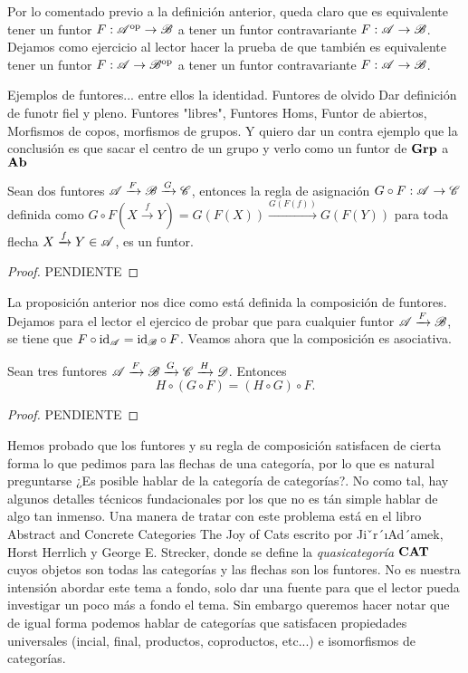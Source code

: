 \documentclass{comunicaciones}
\begin{document}
Por lo comentado previo a la definición anterior, queda claro que es equivalente tener un funtor $F:\mathscr A^{\mathrm{op}}\to\mathscr B$ a tener un funtor contravariante $F:\mathscr A\to\mathscr B$.
Dejamos como ejercicio al lector hacer la prueba de que también es equivalente tener un funtor $F:\mathscr A\to\mathscr B^{\mathrm{op}}$ a tener un funtor contravariante $F:\mathscr A\to\mathscr B$.



Ejemplos de funtores... entre ellos la identidad. Funtores de olvido Dar definición de funotr fiel y pleno. Funtores "libres", Funtores Homs, Funtor de abiertos, Morfismos de copos, morfismos de grupos. 
Y quiero dar un contra ejemplo que la conclusión es que sacar el centro de un grupo y verlo como un funtor de $\mathbf{Grp}$ a $\mathbf{Ab}$

\begin{prop}
    Sean dos funtores $\mathscr A\xrightarrow{F}\mathscr B\xrightarrow{G}\mathscr C$, entonces la regla de asignación $G\circ F:\mathscr A\to\mathscr C$ definida como 
    $G\circ F(X\xrightarrow{f}Y)=G(F(X))\xrightarrow{G(F(f))}G(F(Y))$ para toda flecha $X\xrightarrow{f}Y\in\mathscr A$, es un funtor.
\end{prop}
\begin{proof}
    PENDIENTE
\end{proof}

La proposición anterior nos dice como está definida la composición de funtores. Dejamos para el lector el ejercico de probar que para cualquier funtor $\mathscr A\xrightarrow{F}\mathscr B$, se tiene que $F\circ\mathrm{id}_\mathscr A=\mathrm{id}_\mathscr B\circ F$.
Veamos ahora que la composición es asociativa.

\begin{prop}
    Sean tres funtores $\mathscr A\xrightarrow{F}\mathscr B\xrightarrow{G}\mathscr C\xrightarrow{H}\mathscr D$. Entonces $$H\circ(G\circ F)=(H\circ G)\circ F.$$
\end{prop}
\begin{proof}
    PENDIENTE
\end{proof}

Hemos probado que los funtores y su regla de composición satisfacen de cierta forma lo que pedimos para las flechas de una categoría, por lo que es natural preguntarse
¿Es posible hablar de la categoría de categorías?. No como tal, hay algunos detalles técnicos fundacionales por los que no es tán simple hablar de algo tan inmenso. Una manera de
tratar con este problema está en el libro Abstract and Concrete Categories The Joy of Cats escrito por Jiˇr´ıAd´amek, Horst Herrlich y George E. Strecker, donde se define la 
\emph{quasicategoría} $\mathbf{CAT}$ cuyos objetos son todas las categorías y las flechas son los funtores. No es nuestra intensión abordar este tema a fondo, 
solo dar una fuente para que el lector pueda investigar un poco más a fondo el tema. Sin embargo queremos hacer notar que de igual forma podemos
hablar de categorías que satisfacen propiedades universales (incial, final, productos, coproductos, etc...) e isomorfismos de categorías.
\end{document}
